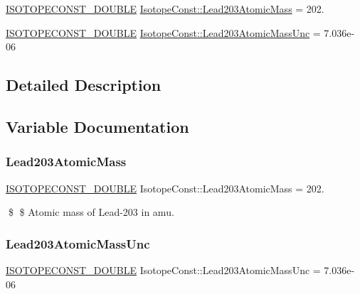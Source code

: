\begin{DoxyCompactItemize}
\item 
\mbox{\hyperlink{group___isotope_const-_macros_ga8f45a7272ce02c0b4c65c44636ed719a}{I\+S\+O\+T\+O\+P\+E\+C\+O\+N\+S\+T\+\_\+\+D\+O\+U\+B\+LE}} \mbox{\hyperlink{group___isotope_const-_lead-_pb203_ga90dac908bd475bcb16b698f057c5acf5}{Isotope\+Const\+::\+Lead203\+Atomic\+Mass}} = 202.
\item 
\mbox{\hyperlink{group___isotope_const-_macros_ga8f45a7272ce02c0b4c65c44636ed719a}{I\+S\+O\+T\+O\+P\+E\+C\+O\+N\+S\+T\+\_\+\+D\+O\+U\+B\+LE}} \mbox{\hyperlink{group___isotope_const-_lead-_pb203_gad13da5960936b13d5a7822682df99bd2}{Isotope\+Const\+::\+Lead203\+Atomic\+Mass\+Unc}} = 7.\+036e-\/06
\end{DoxyCompactItemize}


\subsection{Detailed Description}


\subsection{Variable Documentation}
\mbox{\label{group___isotope_const-_lead-_pb203_ga90dac908bd475bcb16b698f057c5acf5}} 
\subsubsection{\texorpdfstring{Lead203\+Atomic\+Mass}{Lead203AtomicMass}}
{\footnotesize\ttfamily \mbox{\hyperlink{group___isotope_const-_macros_ga8f45a7272ce02c0b4c65c44636ed719a}{I\+S\+O\+T\+O\+P\+E\+C\+O\+N\+S\+T\+\_\+\+D\+O\+U\+B\+LE}} Isotope\+Const\+::\+Lead203\+Atomic\+Mass = 202.}

\$ \$ Atomic mass of Lead-\/203 in amu. \mbox{\label{group___isotope_const-_lead-_pb203_gad13da5960936b13d5a7822682df99bd2}} 
\subsubsection{\texorpdfstring{Lead203\+Atomic\+Mass\+Unc}{Lead203AtomicMassUnc}}
{\footnotesize\ttfamily \mbox{\hyperlink{group___isotope_const-_macros_ga8f45a7272ce02c0b4c65c44636ed719a}{I\+S\+O\+T\+O\+P\+E\+C\+O\+N\+S\+T\+\_\+\+D\+O\+U\+B\+LE}} Isotope\+Const\+::\+Lead203\+Atomic\+Mass\+Unc = 7.\+036e-\/06}

